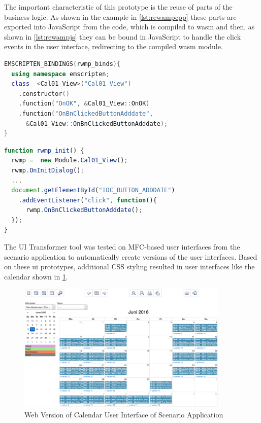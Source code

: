 The important characteristic of this prototype is the reuse of parts of the \legacy business logic.
As shown in the example in \cref{lst:rewampcpp} these parts are exported into JavaScript from the \cpp code, which is compiled to \gls{wasm} and then, as shown in \cref{lst:rewampjs} they can be bound in JavaScript to handle the click events in the \web user interface, redirecting to the compiled \gls{wasm} module.
\begin{lstlisting}[language=C++, captionpos=t, caption=Example of C++ Code Added by ReWaMP to Export Legacy Functionality to JavaScript, label=lst:rewampcpp]
EMSCRIPTEN_BINDINGS(rwmp_binds){
  using namespace emscripten;
  class_ <Cal01_View>("Cal01_View")
    .constructor()
    .function("OnOK", &Cal01_View::OnOK)
    .function("OnBnClickedButtonAdddate",
      &Cal01_View::OnBnClickedButtonAdddate);
}
\end{lstlisting}
\begin{lstlisting}[language=JavaScript, captionpos=t, caption=JavaScript Binding EventHandler of Button to Exported Legacy Functionality, label=lst:rewampjs]
function rwmp_init() {
  rwmp =  new Module.Cal01_View();
  rwmp.OnInitDialog();
  ...
  document.getElementById("IDC_BUTTON_ADDDATE")
    .addEventListener("click", function(){
      rwmp.OnBnClickedButtonAdddate();
  });
}
\end{lstlisting}


The UI Transformer tool was tested on MFC-based \legacy user interfaces from the scenario application to automatically create \web versions of the user interfaces.
Based on these \gls{ui} prototypes, additional CSS styling resulted in user interfaces like the calendar shown in \cref{fig:eval.ui-transform}.

\begin{figure}[h!]
\hypertarget{fig:eval.ui-transform}{%
\centering
\includegraphics[width=0.9\textwidth]{../figures/screenshots/calendar.png}
\caption[Web Version of Calendar User Interface]{Web Version of Calendar User Interface of Scenario Application}\label{fig:eval.ui-transform}
}
\end{figure}

